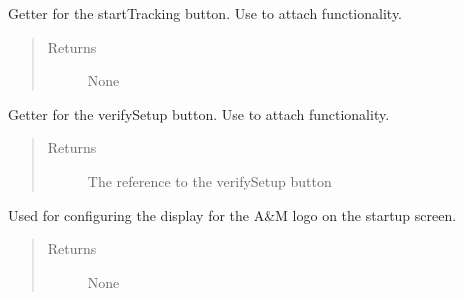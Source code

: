 \documentclass[letterpaper,10pt,english]{sphinxmanual}
\begin{document}
\begin{fulllineitems}
\begin{fulllineitems}
\begin{quote}
\begin{description}
\end{description}\end{quote}

\end{fulllineitems}


\begin{fulllineitems}
\label{\detokenize{index:src.Views.View_StartupScreen.StartupWindow.set_BtnStart}}
Getter for the startTracking button. Use to attach functionality.
\begin{quote}\begin{description}
\item[{Returns}] \leavevmode
None

\end{description}\end{quote}

\end{fulllineitems}


\begin{fulllineitems}
\label{\detokenize{index:src.Views.View_StartupScreen.StartupWindow.set_BtnVerifySetup}}
Getter for the verifySetup button. Use to attach functionality.
\begin{quote}\begin{description}
\item[{Returns}] \leavevmode
The reference to the verifySetup button

\end{description}\end{quote}

\end{fulllineitems}


\begin{fulllineitems}
\label{\detokenize{index:src.Views.View_StartupScreen.StartupWindow.setupAMLogo}}
Used for configuring the display for the A\&M logo on the startup screen.
\begin{quote}\begin{description}
\item[{Returns}] \leavevmode
None


\end{description}
\end{quote}
\end{fulllineitems}
\end{fulllineitems}
\end{document}
